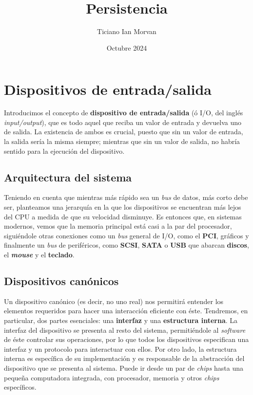 \documentclass{article}
\title{Persistencia}
\author{Ticiano Ian Morvan}
\date{Octubre 2024}
\begin{document}
	\maketitle
	
	\section{Dispositivos de entrada/salida}
	
	Introducimos el concepto de \textbf{dispositivo de entrada/salida} (ó I/O, del inglés \textit{input/output}), que es todo aquel que reciba un valor de entrada y devuelva uno de salida. La existencia de ambos es crucial, puesto que sin un valor de entrada, la salida sería la misma siempre; mientras que sin un valor de salida, no habría sentido para la ejecución del dispositivo.
	
	\subsection{Arquitectura del sistema}
	Teniendo en cuenta que mientras más rápido sea un \textit{bus} de datos, más corto debe ser, planteamos una jerarquía en la que los dispositivos se encuentran más lejos del CPU a medida de que su velocidad disminuye. Es entonces que, en sistemas modernos, vemos que la memoria principal está casi a la par del procesador, siguiéndole otras conexiones como un \textit{bus} general de I/O, como el \textbf{PCI}, gráficos y finalmente un \textit{bus} de periféricos, como \textbf{SCSI}, \textbf{SATA} o \textbf{USB} que abarcan \textbf{discos}, el \textit{\textbf{mouse}} y el \textbf{teclado}.
	
	\subsection{Dispositivos canónicos}
	Un dispositivo canónico (es decir, no uno real) nos permitirá entender los elementos requeridos para hacer una interacción eficiente con éste. Tendremos, en particular, dos partes esenciales: una \textbf{interfaz} y una \textbf{estructura interna}. La interfaz del dispositivo se presenta al resto del sistema, permitiéndole al \textit{software} de éste controlar sus operaciones, por lo que todos los dispositivos especifican una interfaz y un protocolo para interactuar con ellos. Por otro lado, la estructura interna es específica de su implementación y es responsable de la abstracción del dispositivo que se presenta al sistema. Puede ir desde un par de \textit{chips} hasta una pequeña computadora integrada, con procesador, memoria y otros \textit{chips} específicos.
	
\end{document}
